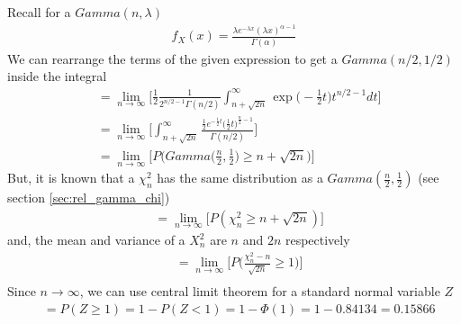 \documentclass[../../probability-notes.tex]{subfiles}
\begin{document}
    Recall for a $Gamma(n, \lambda)$
    \begin{align*}
        f_{X}(x) = \frac{\lambda e^{-\lambda x} (\lambda x)^{\alpha - 1}}{\Gamma(\alpha)}
    \end{align*}
    We can rearrange the terms of the given expression to get a $Gamma(n/2, 1/2)$ inside the integral
    \begin{align*}
        &= \lim_{n \to \infty} \bigg[ \frac{1}{2}\frac{1}{2^{n/2 - 1}\Gamma(n/2)} \int_{n + \sqrt{2n}}^{\infty} \exp \bigg( -\frac{1}{2}t \bigg) t^{n/2 - 1} dt \bigg]\\
        &= \lim_{n \to \infty} \bigg[ \int_{n + \sqrt{2n}}^{\infty} \frac{\frac{1}{2}e^{-\frac{1}{2}t} \big(\frac{1}{2}t \big)^{\frac{n}{2} - 1}}{\Gamma(n/2)} \bigg]\\
        &= \lim_{n \to \infty} \bigg[ P \bigg(Gamma \bigg(\frac{n}{2}, \frac{1}{2} \bigg) \geq n + \sqrt{2n}\bigg) \bigg]
    \end{align*}
    But, it is known that a $\chi^{2}_{n}$ has the same distribution as a $Gamma(\frac{n}{2}, \frac{1}{2})$ (see section \ref{sec:rel_gamma_chi})
    \begin{align*}
        &= \lim_{n \to \infty} \bigg[ P(\chi^{2}_{n} \geq n + \sqrt{2n}) \bigg]
    \end{align*}
    and, the mean and variance of a $X^{2}_{n}$ are $n$ and $2n$ respectively
    \begin{align*}
        &= \lim_{n \to \infty} \bigg[ P \bigg(\frac{\chi^{2}_{n} - n}{\sqrt{2n}} \geq 1 \bigg) \bigg]\\
    \end{align*}
    Since $n \to \infty$, we can use central limit theorem for a standard normal variable $Z$
    \begin{align*}
        &= P(Z \geq 1) = 1 - P(Z < 1) = 1 - \Phi(1) = 1 - 0.84134 = 0.15866
    \end{align*}
\end{document}
